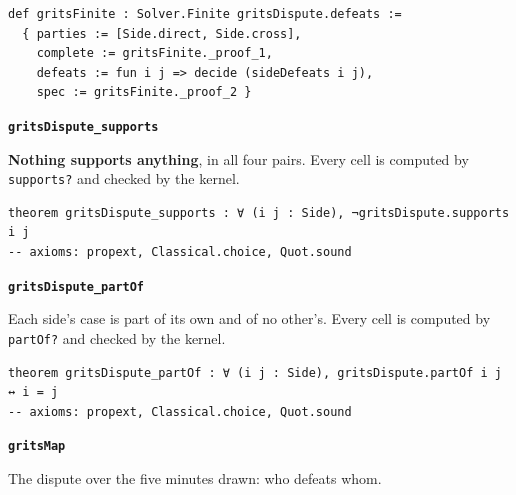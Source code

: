 \documentclass[11pt]{article}
\begin{document}
{\small\begin{verbatim}
def gritsFinite : Solver.Finite gritsDispute.defeats :=
  { parties := [Side.direct, Side.cross],
    complete := gritsFinite._proof_1,
    defeats := fun i j => decide (sideDefeats i j),
    spec := gritsFinite._proof_2 }
\end{verbatim}}
\par\medskip\noindent\textbf{\texttt{grits\allowbreak{}Dispute\_\allowbreak{}supports}}\par\nobreak\noindent
\textbf{Nothing supports anything}, in all four pairs. Every cell is computed by \texttt{supports?} and checked by the kernel.

{\small\begin{verbatim}
theorem gritsDispute_supports : ∀ (i j : Side), ¬gritsDispute.supports i j
-- axioms: propext, Classical.choice, Quot.sound
\end{verbatim}}
\par\medskip\noindent\textbf{\texttt{grits\allowbreak{}Dispute\_\allowbreak{}part\allowbreak{}Of}}\par\nobreak\noindent
Each side’s case is part of its own and of no other’s. Every cell is computed by \texttt{part\allowbreak{}Of?} and checked by the kernel.

{\small\begin{verbatim}
theorem gritsDispute_partOf : ∀ (i j : Side), gritsDispute.partOf i j ↔ i = j
-- axioms: propext, Classical.choice, Quot.sound
\end{verbatim}}
\par\medskip\noindent\textbf{\texttt{grits\allowbreak{}Map}}\par\nobreak\noindent
The dispute over the five minutes drawn: who defeats whom.
\end{document}
